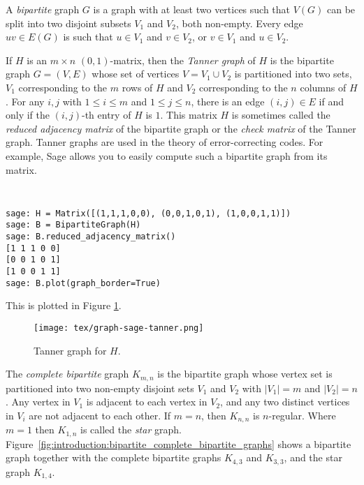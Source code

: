 A \emph{bipartite} graph $G$ is a graph with at least two
vertices such that $V(G)$ can be split into two disjoint subsets $V_1$
and $V_2$, both non-empty. Every edge $uv \in E(G)$ is such that
$u \in V_1$ and $v \in V_2$, or $v \in V_1$ and $u \in V_2$. 

If $H$ is an $m\times n$ $(0,1)$-matrix, then the 
{\it Tanner graph} of $H$ is the bipartite graph $G=(V,E)$
whose set of vertices $V=V_1\cup V_2$ is partitioned
into two sets, $V_1$ corresponding to the $m$ rows of $H$
and $V_2$ corresponding to the $n$ columns of $H$.
For any $i,j$ with $1\leq i\leq m$ and $1\leq j\leq n$, there 
is an edge $(i,j)\in E$ if and only if the $(i,j)$-th
entry of $H$ is $1$. This matrix $H$ is sometimes 
called the {\it reduced adjacency matrix} 
of the bipartite graph or the {\it check matrix}
of the Tanner graph.
Tanner graphs are used in the theory of error-correcting codes.
For example, Sage allows you to easily compute such
a bipartite graph from its matrix.
%
\begin{center}
\fontsize{10pt}{10pt}
\selectfont
\tt
\begin{lstlisting}
sage: H = Matrix([(1,1,1,0,0), (0,0,1,0,1), (1,0,0,1,1)])
sage: B = BipartiteGraph(H)
sage: B.reduced_adjacency_matrix()
[1 1 1 0 0]
[0 0 1 0 1]
[1 0 0 1 1]
sage: B.plot(graph_border=True)
\end{lstlisting}
\end{center}
%

\noindent
This is plotted in Figure \ref{fig:tanner}.

\begin{figure}[h!]
\begin{center}
\texttt{[image: tex/graph-sage-tanner.png]}
\end{center}
\caption{Tanner graph for $H$.}
\label{fig:tanner}
\end{figure}

The
\emph{complete bipartite} graph $K_{m,n}$ is the bipartite graph whose
vertex set is partitioned into two non-empty disjoint sets $V_1$ and
$V_2$ with $|V_1| = m$ and $|V_2| = n$. Any vertex in $V_1$ is
adjacent to each vertex in $V_2$, and any two distinct vertices in
$V_i$ are not adjacent to each other. If $m = n$, then $K_{n,n}$ is
$n$-regular. Where $m = 1$ then $K_{1,n}$ is called the \emph{star}
graph. Figure~\ref{fig:introduction:bipartite_complete_bipartite_graphs}
shows a bipartite graph together with the complete bipartite graphs
$K_{4,3}$ and $K_{3,3}$, and the star graph $K_{1,4}$.


